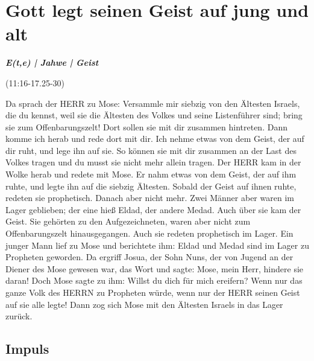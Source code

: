 \newpage
\section{Gott legt seinen Geist auf jung und alt}

\textbf{\textit{E(t,e) | Jahwe | Geist}}

(11:16-17.25-30)
\begin{BibelSt}
Da sprach der HERR zu Mose: Versammle mir siebzig von den Ältesten Israels, die du kennst, weil sie die Ältesten des Volkes und seine Listenführer sind; bring sie zum Offenbarungszelt! Dort sollen sie mit dir zusammen hintreten. Dann komme ich herab und rede dort mit dir. Ich nehme etwas von dem Geist, der auf dir ruht, und lege ihn auf sie. So können sie mit dir zusammen an der Last des Volkes tragen und du musst sie nicht mehr allein tragen. \!
Der HERR kam in der Wolke herab und redete mit Mose. Er nahm etwas von dem Geist, der auf ihm ruhte, und legte ihn auf die siebzig Ältesten. Sobald der Geist auf ihnen ruhte, redeten sie prophetisch. Danach aber nicht mehr.
Zwei Männer aber waren im Lager geblieben; der eine hieß Eldad, der andere Medad. Auch über sie kam der Geist. Sie gehörten zu den Aufgezeichneten, waren aber nicht zum Offenbarungszelt hinausgegangen. Auch sie redeten prophetisch im Lager. Ein junger Mann lief zu Mose und berichtete ihm: Eldad und Medad sind im Lager zu Propheten geworden. Da ergriff Josua, der Sohn Nuns, der von Jugend an der Diener des Mose gewesen war, das Wort und sagte: Mose, mein Herr, hindere sie daran! Doch Mose sagte zu ihm: Willst du dich für mich ereifern? Wenn nur das ganze Volk des HERRN zu Propheten würde, wenn nur der HERR seinen Geist auf sie alle legte! Dann zog sich Mose mit den Ältesten Israels in das Lager zurück.
\end{BibelSt}

\subsection{Impuls}
\begin{impuls}

\begin{description}
\item[]

\end{description}

\end{impuls}

